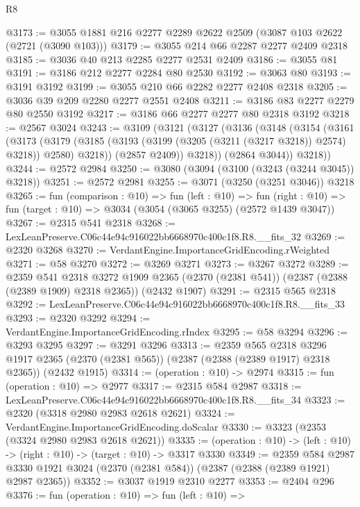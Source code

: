 \begin{lexlean}{R8}
\begin{coremodule}
@3173 := @3055 @1881 @216 @2277 @2289 @2622 @2509 (@3087 @103 @2622 (@2721 (@3090 @103)))
@3179 := @3055 @214 @66 @2287 @2277 @2409 @2318
@3185 := @3036 @40 @213 @2285 @2277 @2531 @2409
@3186 := @3055 @81
@3191 := @3186 @212 @2277 @2284 @80 @2530
@3192 := @3063 @80
@3193 := @3191 @3192
@3199 := @3055 @210 @66 @2282 @2277 @2408 @2318
@3205 := @3036 @39 @209 @2280 @2277 @2551 @2408
@3211 := @3186 @83 @2277 @2279 @80 @2550 @3192
@3217 := @3186 @66 @2277 @2277 @80 @2318 @3192
@3218 := @2567 @3024
@3243 := @3109
    (@3121
      (@3127
        (@3136
          (@3148
            (@3154
              (@3161
                (@3173
                  (@3179
                    (@3185 (@3193 (@3199 (@3205 (@3211 (@3217 @3218)) @2574) @3218)) @2580)
                    @3218))
                (@2857 @2409))
              @3218))
          (@2864 @3044))
        @3218))
@3244 := @2572 @2984
@3250 := @3080 (@3094 (@3100 (@3243 (@3244 @3045)) @3218))
@3251 := @2572 @2981
@3255 := @3071 (@3250 (@3251 @3046)) @3218
@3265 := fun (comparison : @10) =>
  fun (left : @10) =>
  fun (right : @10) => fun (target : @10) => @3034 (@3054 (@3065 @3255) (@2572 @1439 @3047))
@3267 := @2315 @541 @2318
@3268 := LexLeanPreserve.C06c44e94c916022bb6668970c400c1f8.R8.__fits_32
@3269 := @2320 @3268
@3270 := VerdantEngine.ImportanceGridEncoding.rWeighted
@3271 := @58 @3270
@3272 := @3269 @3271
@3273 := @3267 @3272
@3289 := @2359
    @541
    @2318
    @3272
    @1909
    @2365
    (@2370 (@2381 @541))
    (@2387 (@2388 (@2389 @1909) @2318 @2365))
    (@2432 @1907)
@3291 := @2315 @565 @2318
@3292 := LexLeanPreserve.C06c44e94c916022bb6668970c400c1f8.R8.__fits_33
@3293 := @2320 @3292
@3294 := VerdantEngine.ImportanceGridEncoding.rIndex
@3295 := @58 @3294
@3296 := @3293 @3295
@3297 := @3291 @3296
@3313 := @2359
    @565
    @2318
    @3296
    @1917
    @2365
    (@2370 (@2381 @565))
    (@2387 (@2388 (@2389 @1917) @2318 @2365))
    (@2432 @1915)
@3314 := (operation : @10) -> @2974
@3315 := fun (operation : @10) => @2977
@3317 := @2315 @584 @2987
@3318 := LexLeanPreserve.C06c44e94c916022bb6668970c400c1f8.R8.__fits_34
@3323 := @2320 (@3318 @2980 @2983 @2618 @2621)
@3324 := VerdantEngine.ImportanceGridEncoding.doScalar
@3330 := @3323 (@2353 (@3324 @2980 @2983 @2618 @2621))
@3335 := (operation : @10) -> (left : @10) -> (right : @10) -> (target : @10) -> @3317 @3330
@3349 := @2359
    @584
    @2987
    @3330
    @1921
    @3024
    (@2370 (@2381 @584))
    (@2387 (@2388 (@2389 @1921) @2987 @2365))
@3352 := @3037 @1919 @2310 @2277
@3353 := @2404 @296
@3376 := fun (operation : @10) =>
  fun (left : @10) =>

\end{coremodule}
\end{lexlean}
